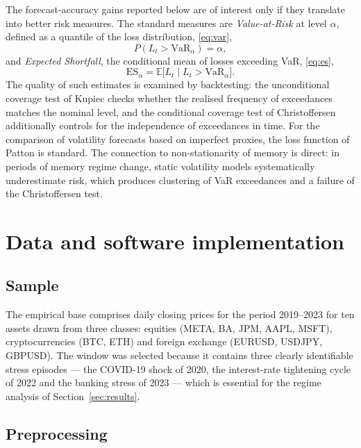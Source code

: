 \documentclass[journal]{IEEEtran}
\begin{document}
The forecast-accuracy gains reported below are of interest only if they translate into better risk
measures. The standard measures are \emph{Value-at-Risk} at level $\alpha$, defined as a quantile
of the loss distribution, \eqref{eq:var},
\begin{equation}\label{eq:var}
P(L_t>\mathrm{VaR}_\alpha)=\alpha,
\end{equation}
and \emph{Expected Shortfall}, the conditional mean of losses exceeding VaR, \eqref{eq:es},
\begin{equation}\label{eq:es}
\mathrm{ES}_\alpha=\mathbb{E}\big[L_t\mid L_t>\mathrm{VaR}_\alpha\big].
\end{equation}
The quality of such estimates is examined by backtesting: the unconditional coverage test of Kupiec
\cite{kupiec1995techniques} checks whether the realised frequency of exceedances matches the
nominal level, and the conditional coverage test of Christoffersen
\cite{christoffersen1998evaluating} additionally controls for the independence of exceedances in
time. For the comparison of volatility forecasts based on imperfect proxies, the loss function of
Patton \cite{patton2011volatility} is standard. The connection to non-stationarity of memory is
direct: in periods of memory regime change, static volatility models systematically underestimate
risk, which produces clustering of VaR exceedances and a failure of the Christoffersen test.

\section{Data and software implementation}\label{sec:data}

\subsection{Sample}

The empirical base comprises daily closing prices for the period 2019--2023 for ten assets drawn
from three classes: equities (META, BA, JPM, AAPL, MSFT), cryptocurrencies (BTC, ETH) and
foreign exchange (EURUSD, USDJPY, GBPUSD). The window was selected because it contains three
clearly identifiable stress episodes --- the COVID-19 shock of 2020, the interest-rate tightening
cycle of 2022 and the banking stress of 2023 --- which is essential for the regime analysis of
Section~\ref{sec:results}.

\subsection{Preprocessing}
\end{document}
